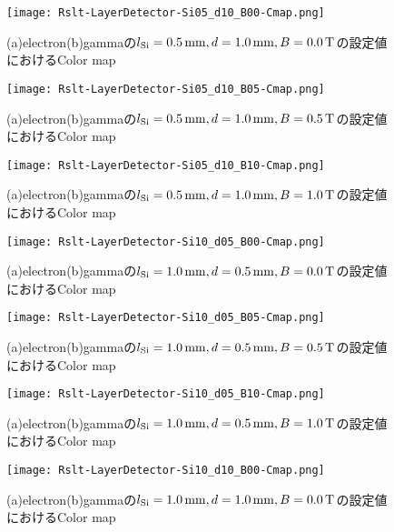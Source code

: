 \documentclass[a4paper,10pt]{jreport}
\begin{document}
\begin{figure}[H]
	\center
	\texttt{[image: Rslt-LayerDetector-Si05\_d10\_B00-Cmap.png]}
	\caption{(a)electron(b)gammaの$l_{\rm{Si}}=\SI{0.5}{mm}, d=\SI{1.0}{mm}, B=\SI{0.0}{T}$の設定値におけるColor map}
	\label{Rslt-LayerDetector-Si05_d10_B00-Cmap}
\end{figure}

\begin{figure}[H]
	\center
	\texttt{[image: Rslt-LayerDetector-Si05\_d10\_B05-Cmap.png]}
	\caption{(a)electron(b)gammaの$l_{\rm{Si}}=\SI{0.5}{mm}, d=\SI{1.0}{mm}, B=\SI{0.5}{T}$の設定値におけるColor map}
	\label{Rslt-LayerDetector-Si05_d10_B05-Cmap}
\end{figure}

\begin{figure}[H]
	\center
	\texttt{[image: Rslt-LayerDetector-Si05\_d10\_B10-Cmap.png]}
	\caption{(a)electron(b)gammaの$l_{\rm{Si}}=\SI{0.5}{mm}, d=\SI{1.0}{mm}, B=\SI{1.0}{T}$の設定値におけるColor map}
	\label{Rslt-LayerDetector-Si05_d10_B10-Cmap}
\end{figure}

\begin{figure}[H]
	\center
	\texttt{[image: Rslt-LayerDetector-Si10\_d05\_B00-Cmap.png]}
	\caption{(a)electron(b)gammaの$l_{\rm{Si}}=\SI{1.0}{mm}, d=\SI{0.5}{mm}, B=\SI{0.0}{T}$の設定値におけるColor map}
	\label{Rslt-LayerDetector-Si10_d05_B00-Cmap}
\end{figure}

\begin{figure}[H]
	\center
	\texttt{[image: Rslt-LayerDetector-Si10\_d05\_B05-Cmap.png]}
	\caption{(a)electron(b)gammaの$l_{\rm{Si}}=\SI{1.0}{mm}, d=\SI{0.5}{mm}, B=\SI{0.5}{T}$の設定値におけるColor map}
	\label{Rslt-LayerDetector-Si10_d05_B05-Cmap}
\end{figure}

\begin{figure}[H]
	\center
	\texttt{[image: Rslt-LayerDetector-Si10\_d05\_B10-Cmap.png]}
	\caption{(a)electron(b)gammaの$l_{\rm{Si}}=\SI{1.0}{mm}, d=\SI{0.5}{mm}, B=\SI{1.0}{T}$の設定値におけるColor map}
	\label{Rslt-LayerDetector-Si10_d05_B10-Cmap}
\end{figure}

\begin{figure}[H]
	\center
	\texttt{[image: Rslt-LayerDetector-Si10\_d10\_B00-Cmap.png]}
	\caption{(a)electron(b)gammaの$l_{\rm{Si}}=\SI{1.0}{mm}, d=\SI{1.0}{mm}, B=\SI{0.0}{T}$の設定値におけるColor map}
	\label{Rslt-LayerDetector-Si10_d10_B00-Cmap}
\end{figure}
\end{document}
